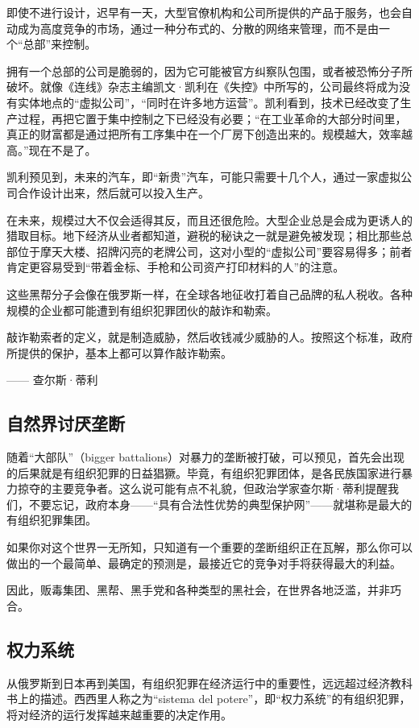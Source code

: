 即使不进行设计，迟早有一天，大型官僚机构和公司所提供的产品于服务，也会自动成为高度竞争的市场，通过一种分布式的、分散的网络来管理，而不是由一个“总部”来控制。

拥有一个总部的公司是脆弱的，因为它可能被官方纠察队包围，或者被恐怖分子所破坏。就像《连线》杂志主编凯文·凯利在《失控》中所写的，公司最终将成为没有实体地点的“虚拟公司”，“同时在许多地方运营”。凯利看到，技术已经改变了生产过程，再把它置于集中控制之下已经没有必要；“在工业革命的大部分时间里，真正的财富都是通过把所有工序集中在一个厂房下创造出来的。规模越大，效率越高。”现在不是了。

凯利预见到，未来的汽车，即“新贵”汽车，可能只需要十几个人，通过一家虚拟公司合作设计出来，然后就可以投入生产。

在未来，规模过大不仅会适得其反，而且还很危险。大型企业总是会成为更诱人的猎取目标。地下经济从业者都知道，避税的秘诀之一就是避免被发现；相比那些总部位于摩天大楼、招牌闪亮的老牌公司，这对小型的“虚拟公司”要容易得多；前者肯定更容易受到“带着金标、手枪和公司资产打印材料的人”的注意。

这些黑帮分子会像在俄罗斯一样，在全球各地征收打着自己品牌的私人税收。各种规模的企业都可能遭到有组织犯罪团伙的敲诈和勒索。

\begin{tcolorbox}
敲诈勒索者的定义，就是制造威胁，然后收钱减少威胁的人。按照这个标准，政府所提供的保护，基本上都可以算作敲诈勒索。
\begin{flushright}
—— 查尔斯·蒂利
\end{flushright}
\end{tcolorbox}

\subsection{自然界讨厌垄断}
随着“大部队”（bigger battalions）对暴力的垄断被打破，可以预见，首先会出现的后果就是有组织犯罪的日益猖獗。毕竟，有组织犯罪团体，是各民族国家进行暴力掠夺的主要竞争者。这么说可能有点不礼貌，但政治学家查尔斯·蒂利提醒我们，不要忘记，政府本身——“具有合法性优势的典型保护网”——就堪称是最大的有组织犯罪集团。

如果你对这个世界一无所知，只知道有一个重要的垄断组织正在瓦解，那么你可以做出的一个最简单、最确定的预测是，最接近它的竞争对手将获得最大的利益。

因此，贩毒集团、黑帮、黑手党和各种类型的黑社会，在世界各地泛滥，并非巧合。

\subsection{权力系统}
从俄罗斯到日本再到美国，有组织犯罪在经济运行中的重要性，远远超过经济教科书上的描述。西西里人称之为“sistema del potere”，即“权力系统”的有组织犯罪，将对经济的运行发挥越来越重要的决定作用。

